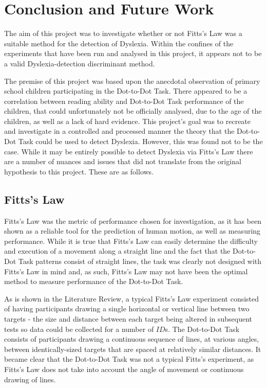 \section{Conclusion and Future Work}
	The aim of this project was to investigate whether or not Fitts’s Law was a suitable method for the detection of Dyslexia. Within the confines of the experiments that have been run and analysed in this project, it appears not to be a valid Dyslexia-detection discriminant method.
	
	The premise of this project was based upon the anecdotal observation of primary school children participating in the Dot-to-Dot Task. There appeared to be a correlation between reading ability and Dot-to-Dot Task performance of the children, that could unfortunately not be officially analysed, due to the age of the children, as well as a lack of hard evidence. This project’s goal was to recreate and investigate in a controlled and processed manner the theory that the Dot-to-Dot Task could be used to detect Dyslexia. However, this was found not to be the case.
	While it may be entirely possible to detect Dyslexia via Fitts’s Law there are a number of nuances and issues that did not translate from the original hypothesis to this project. These are as follows.
	
	\subsection{Fitts’s Law}
		Fitts’s Law was the metric of performance chosen for investigation, as it has been shown as a reliable tool for the prediction of human motion, as well as measuring performance. While it is true that Fitts’s Law can easily determine the difficulty and execution of a movement along a straight line and the fact that the Dot-to-Dot Task patterns consist of straight lines, the task was clearly not designed with Fitts’s Law in mind and, as such, Fitts’s Law may not have been the optimal method to measure performance of the Dot-to-Dot Task. 
		
		As is shown in the Literature Review, a typical Fitts’s Law experiment consisted of having participants drawing a single horizontal or vertical line between two targets - the size and distance between each target being altered in subsequent tests so data could be collected for a number of \(ID\)s. The Dot-to-Dot Task consists of participants drawing a continuous sequence of lines, at various angles, between identically-sized targets that are spaced at relatively similar distances. It became clear that the Dot-to-Dot Task was not a typical Fitts’s experiment, as Fitts’s Law does not take into account the angle of movement or continuous drawing of lines.
	
